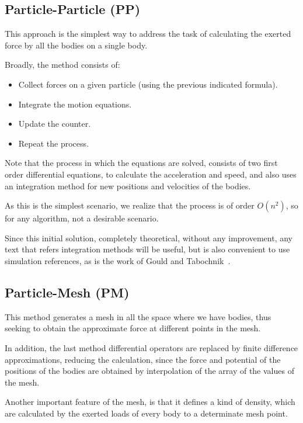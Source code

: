 
\subsection{Particle-Particle (PP)}

This approach is the simplest way to address
the task of calculating the exerted force by all the bodies on a single body.

Broadly, the method consists of:
\begin {itemize}
	\item Collect forces on a given particle (using the previous indicated formula).
	\item Integrate the motion equations.
	\item Update the counter.
	\item Repeat the process.
\end {itemize}

Note that the process in which the equations are solved,
consists of two first order differential equations,
to calculate the acceleration and speed,
and also uses an integration method for new positions and
velocities of the bodies.

As this is the simplest scenario,
we realize that the process is of order $O(n^{2})$,
so for any algorithm, not a desirable scenario.

Since this initial solution, completely theoretical,
without any improvement, any text that refers integration methods will be useful,
but is also convenient to use simulation references,
as is the work of Gould and Tabochnik~\cite{methods}.

\subsection{Particle-Mesh (PM)}

This method generates a mesh in all the space where we have bodies,
thus seeking to obtain the approximate force at different points in the mesh.

In addition, the last method differential operators are replaced by
finite difference approximations, reducing the calculation,
since the force and potential of the positions of the bodies
are obtained by interpolation of the array of
the values of the mesh.

Another important feature of the mesh, is that it defines a kind
of density, which are calculated by the exerted loads of every body
to a determinate mesh point.

